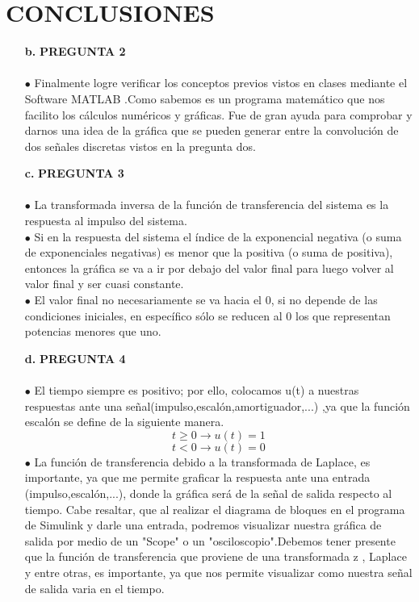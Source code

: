 \documentclass[11pt,a4paper]{article}
\begin{document}
	\section{CONCLUSIONES}{
	\large{
	\begin{enumerate}
	\item[\textbf{b.}]
	\textbf{PREGUNTA 2}\\\\
	$\bullet$ Finalmente logre verificar los conceptos previos vistos en clases mediante el Software MATLAB .Como sabemos es un programa matemático que nos facilito los cálculos numéricos y gráficas. Fue de gran ayuda para comprobar y darnos una idea de la gráfica que se pueden generar entre la convoluci\'on de dos señales discretas vistos en la pregunta dos.\\
	
	\item[\textbf{c.}]
	\textbf{PREGUNTA 3}\\\\
	$\bullet$ La transformada inversa de la función de transferencia del sistema es la respuesta al impulso del sistema.\\
$\bullet$ Si en la respuesta del sistema el índice de la exponencial negativa (o suma de exponenciales negativas) es menor que la positiva (o suma de positiva), entonces la gráfica se va a ir por debajo del valor final para luego volver al valor final y ser cuasi constante.\\
$\bullet$ El valor final no necesariamente se va hacia el 0, si no depende de las condiciones iniciales, en específico sólo se reducen al 0 los que representan potencias menores que uno.\\


	\item[\textbf{d.}]
	\textbf{PREGUNTA 4}\\\\
	$\bullet$ El tiempo siempre es positivo; por ello, colocamos u(t) a nuestras respuestas ante una señal(impulso,escalón,amortiguador,...)
,ya que la función escalón se define de la siguiente manera.
	$$t \geq 0 \rightarrow u(t)=1$$
	$$t < 0 \rightarrow u(t)=0$$
	$\bullet$ La función de transferencia debido a la transformada de Laplace, es importante, ya que me permite graficar la respuesta ante una entrada (impulso,escalón,...), donde la gráfica será de la señal de salida respecto al tiempo. Cabe resaltar, que al realizar el diagrama de bloques en el programa de Simulink y darle una entrada, podremos visualizar nuestra gráfica de salida por medio de un "Scope" o un "osciloscopio".Debemos tener presente que la función de transferencia que proviene de una transformada z , Laplace y entre otras, es importante, ya que nos permite visualizar como nuestra señal de salida varia en el tiempo.
	\end{enumerate}
	}}
	\newpage
\end{document}
